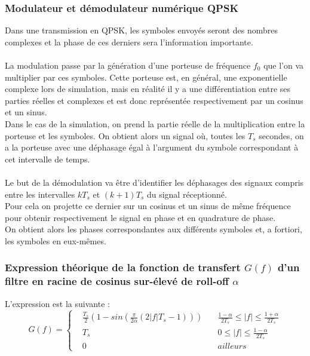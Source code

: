 \documentclass[11pt]{article}
\begin{document}
		\subsubsection{Modulateur et démodulateur numérique QPSK}
			Dans une transmission en QPSK, les symboles envoyés seront des nombres complexes et la phase de ces derniers sera l'information importante.\\\\
			La modulation passe par la génération d'une porteuse de fréquence $f_0$ que l'on va multiplier par ces symboles. Cette porteuse est, en général, une exponentielle complexe lors de simulation, mais en réalité il y a une différentiation entre ses parties réelles et complexes et est donc représentée respectivement par un cosinus et un sinus.\\
			Dans le cas de la simulation, on prend la partie réelle de la multiplication entre la porteuse et les symboles. On obtient alors un signal où, toutes les $T_s$ secondes, on a la porteuse avec une déphasage égal à l'argument du symbole correspondant à cet intervalle de temps.\\\\
			Le but de la démodulation va être d'identifier les déphasages des signaux compris entre les intervalles $kT_s$ et $(k+1)T_s$ du signal réceptionné.\\
			Pour cela on projette ce dernier sur un cosinus et un sinus de même fréquence pour obtenir respectivement le signal en phase et en quadrature de phase.\\
			On obtient alors les phases correspondantes aux différents symboles et, a fortiori, les symboles en eux-mêmes.
			
		\subsubsection{Expression théorique de la fonction de transfert $G(f)$ d'un filtre en racine de cosinus sur-élevé de roll-off $\alpha$}
			L'expression est la suivante :
				\begin{equation}
					G(f) = 
					\left\{
							\begin{aligned}
								&\frac{T_s}{2}(1-sin(\frac{\pi}{2\alpha}(2\lvert f \rvert T_s - 1)))&\,\,\,\,\,\, \frac{1-\alpha}{2T_s} \le \lvert f \rvert \le \frac{1+\alpha}{2T_s}\\
								&T_s&\,\,\,\,\,\, 0 \le \lvert f \rvert \le \frac{1-\alpha}{2T_s} \\
								&0&\,\,\,\,\,\, ailleurs
								\end{aligned}
						\right.
				\end{equation}
			
\end{document}

